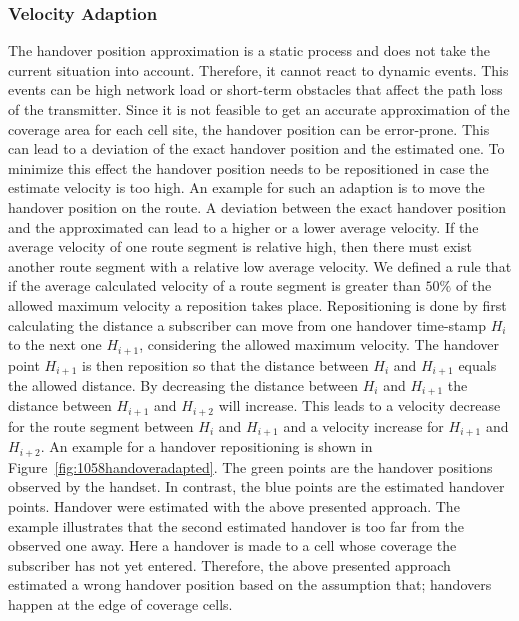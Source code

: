 \documentclass[master,english]{hgbthesis}
\begin{document}
\subsubsection{Velocity Adaption}
\label{sec:adaption}
The handover position approximation is a static process and does not take the current situation into account. Therefore, it cannot react to dynamic events. This events can be high network load or short-term obstacles that affect the path loss of the transmitter. Since it is not feasible to get an accurate approximation of the coverage area for each cell site, the handover position can be error-prone. This can lead to a deviation of the exact handover position and the estimated one. To minimize this effect the handover position needs to be repositioned in case the estimate velocity is too high. An example for such an adaption is to move the handover position on the route. 
A deviation between the exact handover position and the approximated can lead to a higher or a lower average velocity. If the average velocity of one route segment is relative high, then there must exist another route segment with a relative low average velocity. We defined a rule that if the average calculated velocity of a route segment is greater than $50\%$ of the allowed maximum velocity a reposition takes place.  
Repositioning is done by first calculating the distance a subscriber can move from one handover time-stamp $H_i$ to the next one $H_{i+1}$, considering the allowed maximum velocity. The handover point $H_{i+1 }$ is then reposition so that the distance between $H_i$ and $H_{i+1}$ equals the allowed distance. By decreasing the distance between $H_i$ and $H_{i+1}$ the distance between $H_{i+1}$ and $H_{i+2}$ will increase. This leads to a velocity decrease for the route segment between $H_i$ and $H_{i+1}$ and a velocity increase for $H_{i+1}$  and $H_{i+2}$.
An example for a handover repositioning is shown in Figure~\ref{fig:1058handoveradapted}. The green points are the handover positions observed by the handset. In contrast, the blue points are the estimated handover points. Handover were estimated with the above presented approach. The example illustrates that the second estimated handover is too far from the observed one away. Here a handover is made to a cell whose coverage the subscriber has not yet entered. Therefore, the above presented approach estimated a wrong handover position based on the assumption that; handovers happen at the edge of coverage cells. 
\end{document}
